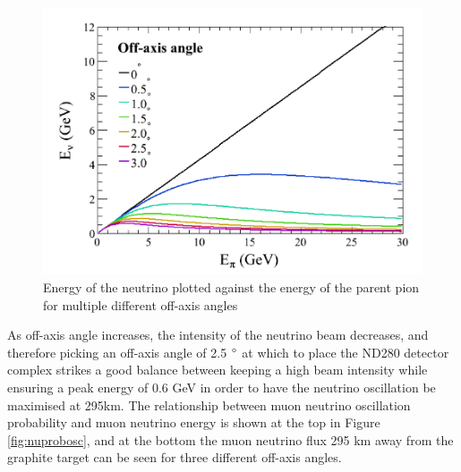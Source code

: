\begin{figure}
\includegraphics[width=\textwidth]{Figures/energyangle.png}
\caption{Energy of the neutrino plotted against the energy of the parent pion for multiple different off-axis angles}
    \label{fig:energyangle}
\end{figure}

As off-axis angle increases, the intensity of the neutrino beam decreases, and therefore picking an off-axis angle of 2.5 $\degree$ at which to place the ND280 detector complex strikes a good balance between keeping a high beam intensity while ensuring a peak energy of 0.6 GeV in order to have the neutrino oscillation be maximised at 295km. The relationship between muon neutrino oscillation probability and muon neutrino energy is shown at the top in Figure \ref{fig:nuprobosc}, and at the bottom the muon neutrino flux 295 km away from the graphite target can be seen for three different off-axis angles.

